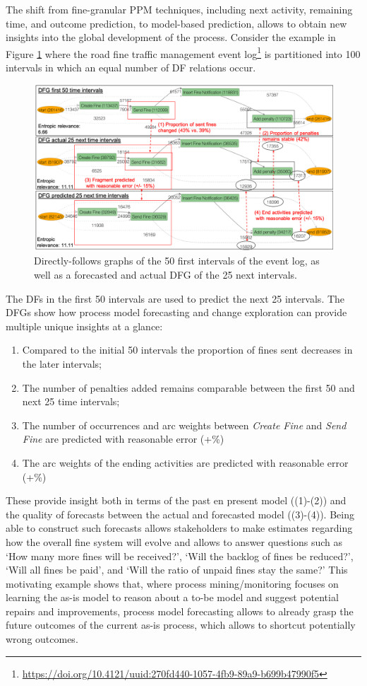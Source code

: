 The shift from fine-granular PPM techniques, including next activity, remaining time, and outcome prediction, to model-based prediction, allows to obtain new insights into the global development of the process.
Consider the example in Figure \ref{fig:dfg_example_intro} where the road fine traffic management event log\footnote{\url{https://doi.org/10.4121/uuid:270fd440-1057-4fb9-89a9-b699b47990f5}} is partitioned into 100 intervals in which an equal number of DF relations occur.
\begin{figure}
    \centering
    \includegraphics[width=\textwidth]{img/MotExample.png}
    \caption{Directly-follows graphs of the 50 first intervals of the event log, as well as a forecasted and actual DFG of the 25 next intervals.}
    \label{fig:dfg_example_intro}
\end{figure}
The DFs in the first 50 intervals are used to predict the next 25 intervals.
The DFGs show how process model forecasting and change exploration can provide multiple unique insights at a glance:
\begin{enumerate}
    \item Compared to the initial 50 intervals the proportion of fines sent decreases in the later intervals;
    \item The number of penalties added remains comparable between the first 50 and next 25 time intervals;
    \item The number of occurrences and arc weights between \emph{Create Fine} and \emph{Send Fine} are predicted with reasonable error (+\%)
    \item The arc weights of the ending activities are predicted with reasonable error (+\%)
\end{enumerate}
These provide insight both in terms of the past en present model ((1)-(2)) and the quality of forecasts between the actual and forecasted model ((3)-(4)).
Being able to construct such forecasts allows stakeholders to make estimates regarding how the overall fine system will evolve and allows to answer questions such as `How many more fines will be received?', `Will the backlog of fines be reduced?', `Will all fines be paid', and `Will the ratio of unpaid fines stay the same?'
This motivating example shows that, where process mining/monitoring focuses on learning the as-is model to reason about a to-be model and suggest potential repairs and improvements, process model forecasting allows to already grasp the future outcomes of the current as-is process, which allows to shortcut potentially wrong outcomes. 

